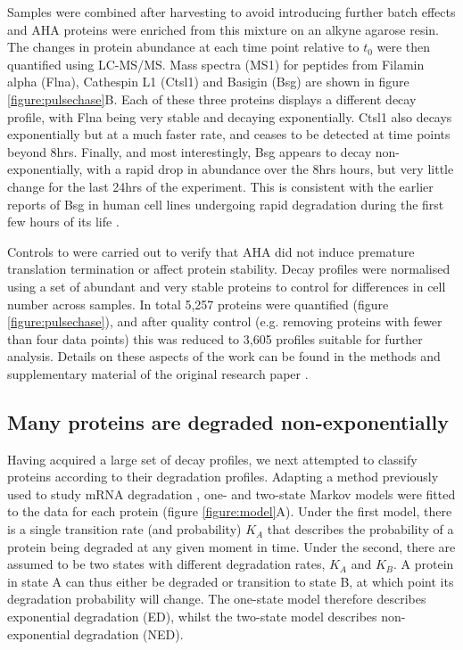 \documentclass[a4paper,11pt,twoside,openright]{scrbook}
\begin{document}
Samples were combined after harvesting to avoid introducing further batch effects and AHA proteins were enriched from this mixture on an alkyne agarose resin. The changes in protein abundance at each time point relative to $t_{0}$ were then quantified using LC-MS/MS. Mass spectra (MS1) for peptides from Filamin  alpha (Flna), Cathespin L1 (Ctsl1) and Basigin (Bsg) are shown in figure \ref{figure:pulsechase}B. Each of these three proteins displays a different decay profile, with Flna being very stable and decaying exponentially. Ctsl1 also decays exponentially but at a much faster rate, and ceases to be detected at time points beyond 8hrs. Finally, and most interestingly, Bsg appears to decay non-exponentially, with a rapid drop in abundance over the 8hrs hours, but very little change for the last 24hrs of the experiment. This is consistent with the earlier reports of Bsg in human cell lines undergoing rapid degradation during the first few hours of its life \cite{Tyler2012}.

Controls to were carried out to verify that AHA did not induce premature translation termination or affect protein stability. Decay profiles were normalised using a set of abundant and very stable proteins to control for differences in cell number across samples. In total 5,257 proteins were quantified (figure \ref{figure:pulsechase}), and after quality control (e.g. removing proteins with fewer than four data points) this was reduced to 3,605 profiles suitable for further analysis. Details on these aspects of the work can be found in the methods and supplementary material of the original research paper \cite{McShane2016}.

\subsection{Many proteins are degraded non-exponentially}
Having acquired a large set of decay profiles, we next attempted to classify proteins according to their degradation profiles. Adapting a method previously used to study mRNA degradation \cite{Deneke2013}, one- and two-state Markov models were fitted to the data for each protein (figure \ref{figure:model}A). Under the first model, there is a single transition rate (and probability) $K_{A}$ that describes the probability of a protein being degraded at any given moment in time. Under the second, there are assumed to be two states with different degradation rates, $K_{A}$ and $K_{B}$. A protein in state A can thus either be degraded or transition to state B, at which point its degradation probability will change. The one-state model therefore describes exponential degradation (ED), whilst the two-state model describes non-exponential degradation (NED).
\end{document}
